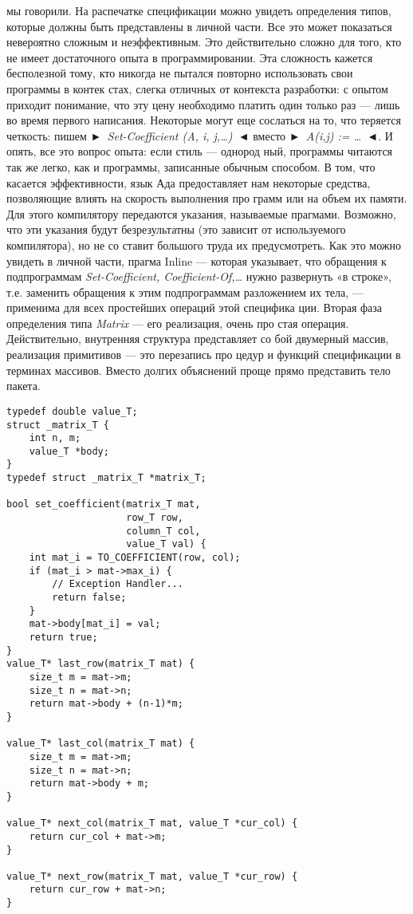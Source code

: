 \documentclass{../../template/mai_book}
\begin{document}
мы говорили. На распечатке спецификации можно увидеть определения
типов, которые должны быть представлены в личной части.
Все это может показаться невероятно сложным и неэффективным.
Это действительно сложно для того, кто не имеет достаточного опыта
в программировании. Эта сложность кажется бесполезной тому, кто
никогда не пытался повторно использовать свои программы в контек­
стах, слегка отличных от контекста разработки: с опытом приходит
понимание, что эту цену необходимо платить один только раз — лишь
во время первого написания. Некоторые могут еще сослаться на то,
что теряется четкость: пишем \textit{►~Set-Coefficient (A, i, j,\dots)~◄} вместо
\textit{►~A(i,j) := \dots~◄}. И опять, все это вопрос опыта: если стиль — однород­
ный, программы читаются так же легко, как и программы, записанные
обычным способом.
В том, что касается эффективности, язык Ада предоставляет нам
некоторые средства, позволяющие влиять на скорость выполнения про­
грамм или на объем их памяти. Для этого компилятору передаются
указания, называемые прагмами. Возможно, что эти указания будут
безрезультатны (это зависит от используемого компилятора), но не со­
ставит большого труда их предусмотреть. Как это можно увидеть в
личной части, прагма Inline — которая указывает, что обращения к
подпрограммам \textit{Set-Coefficient, Coefficient-Of,\dots} нужно развернуть «в
строке», т.е. заменить обращения к этим подпрограммам разложением
их тела, — применима для всех простейших операций этой специфика­
ции.
Вторая фаза определения типа \textit{Matrix} — его реализация, очень про­
стая операция. Действительно, внутренняя структура представляет со­
бой двумерный массив, реализация примитивов — это перезапись про­
цедур и функций спецификации в терминах массивов. Вместо долгих
объяснений проще прямо представить тело пакета.

\begin{lstlisting}
typedef double value_T;
struct _matrix_T {
    int n, m;
    value_T *body;
}
typedef struct _matrix_T *matrix_T;

bool set_coefficient(matrix_T mat,
                     row_T row,
                     column_T col,
                     value_T val) {
    int mat_i = TO_COEFFICIENT(row, col);
    if (mat_i > mat->max_i) {
        // Exception Handler...
        return false;
    }
    mat->body[mat_i] = val;
    return true;
}
value_T* last_row(matrix_T mat) {
    size_t m = mat->m;
    size_t n = mat->n;
    return mat->body + (n-1)*m;
}

value_T* last_col(matrix_T mat) {
    size_t m = mat->m;
    size_t n = mat->n;
    return mat->body + m;
}

value_T* next_col(matrix_T mat, value_T *cur_col) {
    return cur_col + mat->m;
}

value_T* next_row(matrix_T mat, value_T *cur_row) {
    return cur_row + mat->n;
}

\end{lstlisting}
\end{document}
